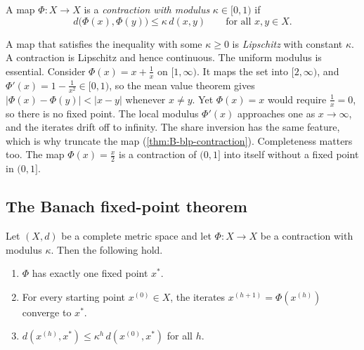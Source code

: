 \begin{definition}[Contraction]\label{def:B-contraction}
A map $\Phi: X \to X$ is a \emph{contraction with modulus} $\kappa \in [0,1)$ if
\begin{equation*}
  d\big(\Phi(x), \Phi(y)\big) \leq \kappa\, d(x, y) \qquad \text{for all } x, y \in X.
\end{equation*}
\end{definition}

A map that satisfies the inequality with some $\kappa \geq 0$ is \emph{Lipschitz} with constant $\kappa$. A
contraction is Lipschitz and hence continuous. The uniform modulus is essential. Consider $\Phi(x) = x +
\frac{1}{x}$ on $[1, \infty)$. It maps the set into $[2, \infty)$, and $\Phi'(x) = 1 - \frac{1}{x^2} \in [0,
1)$, so the mean value theorem gives $|\Phi(x) - \Phi(y)| < |x - y|$ whenever $x \neq y$. Yet $\Phi(x) = x$
would require $\frac{1}{x} = 0$, so there is no fixed point. The local modulus $\Phi'(x)$ approaches one as $x
\to \infty$, and the iterates drift off to infinity. The share inversion has the same feature, which is why
\citet{BerryLevinsohnPakes1995} truncate the map (\cref{thm:B-blp-contraction}). Completeness matters too.
The map $\Phi(x) = \frac{x}{2}$ is a contraction of $(0,1]$ into itself without a fixed point in $(0,1]$.

\subsection{The Banach fixed-point theorem}\label{sec:B-banach}

\begin{theorem}\label{thm:B-banach}
Let $(X, d)$ be a complete metric space and let $\Phi: X \to X$ be a contraction with modulus $\kappa$. Then
the following hold.
\begin{enumerate}[label=(\roman*)]
  \item $\Phi$ has exactly one fixed point $x^*$.
  \item For every starting point $x^{(0)} \in X$, the iterates $x^{(h+1)} = \Phi(x^{(h)})$ converge to $x^*$.
  \item $d(x^{(h)}, x^*) \leq \kappa^h\,d(x^{(0)}, x^*)$ for all $h$.
\end{enumerate}
\end{theorem}


